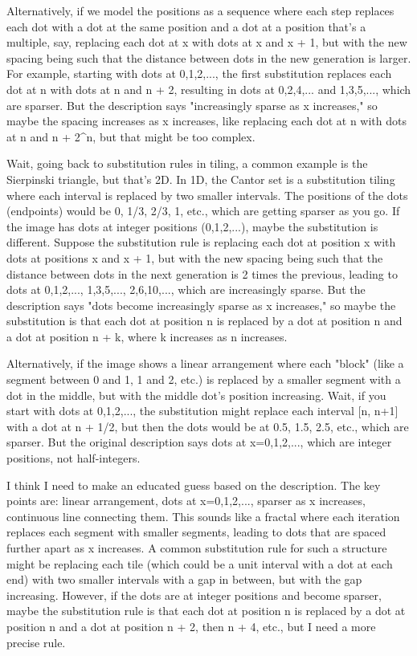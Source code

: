 Alternatively, if we model the positions as a sequence where each step replaces each dot with a dot at the same position and a dot at a position that's a multiple, say, replacing each dot at x with dots at x and x + 1, but with the new spacing being such that the distance between dots in the new generation is larger. For example, starting with dots at 0,1,2,..., the first substitution replaces each dot at n with dots at n and n + 2, resulting in dots at 0,2,4,... and 1,3,5,..., which are sparser. But the description says "increasingly sparse as x increases," so maybe the spacing increases as x increases, like replacing each dot at n with dots at n and n + 2^n, but that might be too complex. 

Wait, going back to substitution rules in tiling, a common example is the Sierpinski triangle, but that's 2D. In 1D, the Cantor set is a substitution tiling where each interval is replaced by two smaller intervals. The positions of the dots (endpoints) would be 0, 1/3, 2/3, 1, etc., which are getting sparser as you go. If the image has dots at integer positions (0,1,2,...), maybe the substitution is different. Suppose the substitution rule is replacing each dot at position x with dots at positions x and x + 1, but with the new spacing being such that the distance between dots in the next generation is 2 times the previous, leading to dots at 0,1,2,..., 1,3,5,..., 2,6,10,..., which are increasingly sparse. But the description says "dots become increasingly sparse as x increases," so maybe the substitution is that each dot at position n is replaced by a dot at position n and a dot at position n + k, where k increases as n increases. 

Alternatively, if the image shows a linear arrangement where each "block" (like a segment between 0 and 1, 1 and 2, etc.) is replaced by a smaller segment with a dot in the middle, but with the middle dot's position increasing. Wait, if you start with dots at 0,1,2,..., the substitution might replace each interval [n, n+1] with a dot at n + 1/2, but then the dots would be at 0.5, 1.5, 2.5, etc., which are sparser. But the original description says dots at x=0,1,2,..., which are integer positions, not half-integers. 

I think I need to make an educated guess based on the description. The key points are: linear arrangement, dots at x=0,1,2,..., sparser as x increases, continuous line connecting them. This sounds like a fractal where each iteration replaces each segment with smaller segments, leading to dots that are spaced further apart as x increases. A common substitution rule for such a structure might be replacing each tile (which could be a unit interval with a dot at each end) with two smaller intervals with a gap in between, but with the gap increasing. However, if the dots are at integer positions and become sparser, maybe the substitution rule is that each dot at position n is replaced by a dot at position n and a dot at position n + 2, then n + 4, etc., but I need a more precise rule. 

